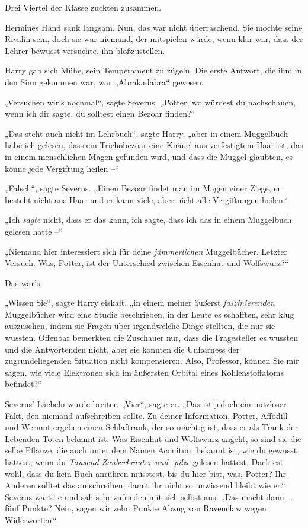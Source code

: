Drei Viertel der Klasse zuckten zusammen. 

Hermines Hand sank langsam. Nun, das war nicht überraschend. Sie mochte seine Rivalin sein, doch sie war niemand, der mitspielen würde, wenn klar war, dass der Lehrer bewusst versuchte, ihn bloßzustellen. 

Harry gab sich Mühe, sein Temperament zu zügeln. Die erste Antwort, die ihm in den Sinn gekommen war, war „Abrakadabra“ gewesen. 

„Versuchen wir’s nochmal“, sagte Severus. „Potter, wo würdest du nachschauen, wenn ich dir sagte, du solltest einen Bezoar finden?“ 

„Das steht auch nicht im Lehrbuch“, sagte Harry, „aber in einem Muggelbuch habe ich gelesen, dass ein Trichobezoar eine Knäuel aus verfestigtem Haar ist, das in einem menschlichen Magen gefunden wird, und dass die Muggel glaubten, es könne jede Vergiftung heilen –“ 

„Falsch“, sagte Severus. „Einen Bezoar findet man im Magen einer Ziege, er besteht nicht aus Haar und er kann viele, aber nicht alle Vergiftungen heilen.“ 

„Ich \emph{sagte} nicht, dass er das kann, ich sagte, dass ich das in einem Muggelbuch gelesen hatte –“ 

„Niemand hier interessiert sich für deine \emph{jämmerlichen} Muggelbücher. Letzter Versuch. Was, Potter, ist der Unterschied zwischen Eisenhut und Wolfswurz?“ 

Das war’s. 

„Wissen Sie“, sagte Harry eiskalt, „in einem meiner äußerst \emph{faszinierenden} Muggelbücher wird eine Studie beschrieben, in der Leute es schafften, sehr klug auszusehen, indem sie Fragen über irgendwelche Dinge stellten, die nur sie wussten. Offenbar bemerkten die Zuschauer nur, dass die Fragesteller es wussten und die Antwortenden nicht, aber sie konnten die Unfairness der zugrundeliegenden Situation nicht kompensieren. Also, Professor, können Sie mir sagen, wie viele Elektronen sich im äußersten Orbital eines Kohlenstoffatoms befindet?“ 

Severus’ Lächeln wurde breiter. „Vier“, sagte er. „Das ist jedoch ein nutzloser Fakt, den niemand aufschreiben sollte. Zu deiner Information, Potter, Affodill und Wermut ergeben einen Schlaftrank, der so mächtig ist, dass er als Trank der Lebenden Toten bekannt ist. Was Eisenhut und Wolfswurz angeht, so sind sie die selbe Pflanze, die auch unter dem Namen Aconitum bekannt ist, wie du gewusst hättest, wenn du \emph{Tausend Zauberkräuter und -pilze} gelesen hättest. Dachtest wohl, dass du kein Buch anrühren müsstest, bis du hier bist, was, Potter? Ihr Anderen solltet das aufschreiben, damit ihr nicht so unwissend bleibt wie er.“ Severus wartete und sah sehr zufrieden mit sich selbst aus. „Das macht dann … fünf Punkte? Nein, sagen wir zehn Punkte Abzug von Ravenclaw wegen Widerworten.“ 

